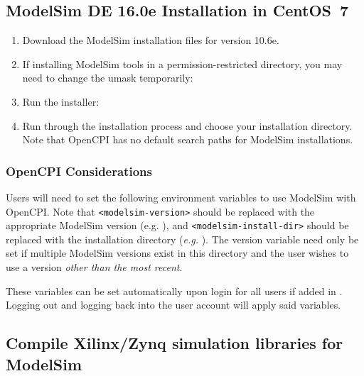 \subsection{ModelSim DE 16.0e Installation in CentOS~7}
\begin{flushleft}
\begin{enumerate}
	\item Download the ModelSim installation files for version 10.6e.
\item If installing ModelSim tools in a permission-restricted directory, you may need to change the umask temporarily:\newline
{}\newline
{}
\item Run the installer:\newline
{}
\item Run through the installation process and choose your installation directory. Note that OpenCPI has no default search paths for ModelSim installations.
\end{enumerate}


\subsubsection{OpenCPI Considerations}
Users will need to set the following environment variables to use ModelSim with OpenCPI. Note that \texttt{<modelsim-version>} should be replaced with the appropriate ModelSim version (e.g. ), and \texttt{<modelsim-install-dir>} should be replaced with the installation directory (\textit{e.g.} ). The version variable need only be set if multiple ModelSim versions exist in this directory and the user wishes to use a version \textit{other than the most recent}.\\
\newline
{}\newline
{}

These variables can be set automatically upon login for all users if added in . Logging out and logging back into the user account will apply said variables.
\subsection{Compile Xilinx/Zynq simulation libraries for ModelSim}


\end{flushleft}
